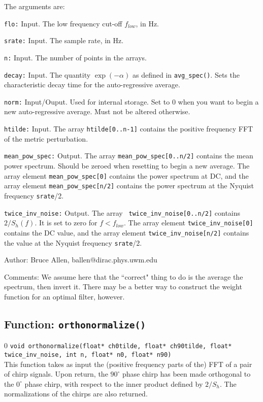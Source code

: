 The arguments are:
\begin{description}
\item{\tt flo:} Input.  The low frequency cut-off $f_{low}$, in Hz.
\item{\tt srate:} Input.  The sample rate, in Hz.
\item{\tt n:} Input.  The number of points in the arrays.
\item{\tt decay:} Input.  The quantity $\exp(-\alpha)$ as defined in {\tt avg\_spec()}.
  Sets the characteristic decay time for the auto-regressive average.
\item{\tt norm:} Input/Ouput.  Used for internal storage.  Set to $0$ when you want to begin
   a new auto-regressive average.  Must not be altered otherwise.
\item{\tt htilde:} Input.  The array {\tt htilde[0..n-1]} contains the positive frequency FFT of
   the metric perturbation.
\item{\tt mean\_pow\_spec:} Output.  The array {\tt mean\_pow\_spec[0..n/2]} contains the 
  mean power spectrum.  Should be zeroed when resetting to begin a new average.  The array
element {\tt mean\_pow\_spec[0]} contains the power spectrum at DC, and the array
element {\tt mean\_pow\_spec[n/2]} contains the power spectrum at the Nyquist frequency
{\tt srate}/2.
\item{\tt twice\_inv\_noise:} Output.  The array {\tt
   twice\_inv\_noise[0..n/2]} contains $2/S_h(f)$.  It is set to zero for
   $f<f_{low}$.  The array element {\tt twice\_inv\_noise[0]} contains
   the DC value, and the array element {\tt twice\_inv\_noise[n/2]}
   contains the value at the Nyquist frequency {\tt srate}/2.
\end{description}
\begin{description}
\item{Author:}
Bruce Allen, ballen@dirac.phys.uwm.edu
\item{Comments:}
We assume here that the ``correct" thing to do is the average the
spectrum, then invert it.  There may be a better way to construct
the weight function for an optimal filter, however.
\end{description}
\clearpage

\subsection{Function: {\tt orthonormalize()}}
\label{ss:orthonormalize}
\setcounter{equation}0
{\tt void orthonormalize(float* ch0tilde, float* ch90tilde, float* twice\_inv\_noise, int n, float* n0, float* n90)}\\
This function takes as input the (positive frequency parts of the) FFT
of a pair of chirp signals.  Upon return, the $90^\circ$ phase chirp
has been made orthogonal to the $0^\circ$ phase chirp, with respect to
the inner product defined by $2/S_h$.  The normalizations of the chirps
are also returned.

